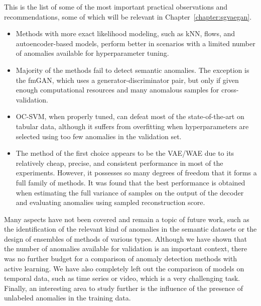 This is the list of some of the most important practical observations and recommendations, some of which will be relevant in Chapter~\ref{chapter:sgvaegan}.
\begin{itemize}
    \item Methods with more exact likelihood modeling, such as kNN, flows, and autoencoder-based models, perform better in scenarios with a limited number of anomalies available for hyperparameter tuning.
    \item Majority of the methods fail to detect semantic anomalies. The exception is the fmGAN, which uses a generator-discriminator pair, but only if given enough computational resources and many anomalous samples for cross-validation. 
    \item OC-SVM, when properly tuned, can defeat most of the state-of-the-art on tabular data, although it suffers from overfitting when hyperparameters are selected using too few anomalies in the validation set.
    \item The method of the first choice appears to be the VAE/WAE due to its relatively cheap, precise, and consistent performance in most of the experiments. However, it possesses so many degrees of freedom that it forms a full family of methods. It was found that the best performance is obtained when estimating the full variance of samples on the output of the decoder and evaluating anomalies using sampled reconstruction score. 
\end{itemize}

Many aspects have not been covered and remain a topic of future work, such as the identification of the relevant kind of anomalies in the semantic datasets or the design of ensembles of methods of various types. Although we have shown that the number of anomalies available for validation is an important context, there was no further budget for a comparison of anomaly detection methods with active learning.  We have also completely left out the comparison of models on temporal data, such as time series or video, which is a very challenging task. Finally, an interesting area to study further is the influence of the presence of unlabeled anomalies in the training data.
